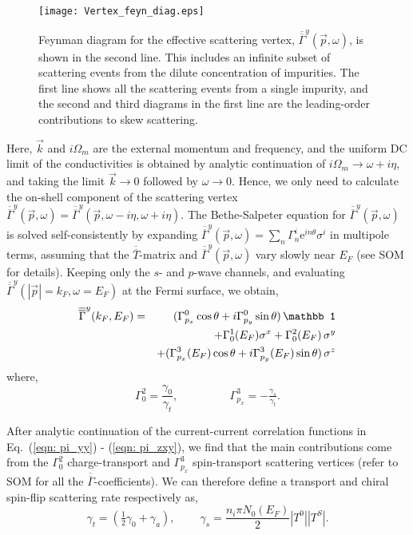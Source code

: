 \documentclass[twocolumn,epsfig,a4paper,amsmath,amssymb,showpacs,prl,superscriptaddress]{revtex4-1}
\newcommand{\be}{\begin{equation}}
\newcommand{\ee}{\end{equation}}
\newcommand{\ba}{\begin{eqnarray}}
\newcommand{\ea}{\end{eqnarray}}
\newcommand{\mI}{{\mathbb 1}}
\newcommand{\me}{\mathrm{e}}
\newcommand{\Tbar}{\overline{\overline{T}}}
\newcommand{\Gammabar}{\overline{\overline{\Gamma}}}
\begin{document}
\begin{figure}[bht!]
\begin{center}
\texttt{[image: Vertex\_feyn\_diag.eps]}
\end{center}
\captionsetup{justification=RaggedRight, singlelinecheck=false}
\caption{\label{fig: Vertex Feyn diag} 
Feynman diagram for the effective scattering vertex, $\Gammabar^{y}(\vec{p}, \omega)$, is shown in the second line. This includes an infinite subset of scattering events from the dilute concentration of  impurities. The first line shows all the scattering events from a single impurity, and the second and third diagrams in the first line are the leading-order contributions to skew scattering.}
\end{figure}

Here, $\vec{k}$ and $i \Omega_m$ are the  external momentum and frequency, and the uniform DC limit of the conductivities is obtained by analytic continuation of $i \Omega_m \rightarrow \omega + i \eta$, and taking the limit $\vec{k} \rightarrow 0$ followed by $\omega \rightarrow 0$. Hence, we only need to calculate the on-shell component of the scattering vertex $\Gammabar^{y}(\vec{p}, \omega) = \Gammabar^{y}(\vec{p}, \omega - i \eta, \omega + i \eta)$. The Bethe-Salpeter equation for $\Gammabar^{y}(\vec{p}, \omega)$ is solved self-consistently by expanding $\Gammabar^{y}(\vec{p}, \omega) = \sum_{n} \Gamma^{i}_{n} \me^{i n \theta} \sigma^i $ in multipole terms, assuming that the $\Tbar$-matrix and $\Gammabar^{y}(\vec{p}, \omega)$ vary slowly near $E_F$ (see SOM for details). Keeping only the $s$- and $p$-wave channels, and evaluating $\Gammabar^{y}(|\vec{p}| = k_F, \omega = E_F)$ at the Fermi surface, we obtain,
%
\ba
\label{eqn: vertex func}
\Gammabar^{y}(k_F, E_F) & = & (\Gamma^0_{p_x} \cos \theta + i \Gamma^0_{p_y} \sin \theta) \, \mI \\
 & & + \Gamma^1_0(E_F) \sigma^x + \Gamma^2_0(E_F) \, \sigma^y  \cr
 & & + (\Gamma^3_{p_x}(E_F) \cos \theta + i \Gamma^3_{p_y}(E_F) \sin \theta) \, \sigma^z \nonumber
\ea 
%
where,
%
\be
\Gamma^2_0 = \frac{\gamma_0}{\gamma_{t}}  \text{,}    \hspace{2cm}   \Gamma^3_{p_x} = - \tfrac{\gamma_{s}}{\gamma_t}.
\ee 

After analytic continuation of the current-current correlation functions in Eq.~(\ref{eqn: pi_yy})  - (\ref{eqn: pi_zxy}), we find that the main contributions come from the $\Gamma^2_0$ charge-transport and $\Gamma^3_{p_x}$ spin-transport scattering vertices (refer to SOM for all the $\Gammabar$-coefficients). We can therefore define a transport and chiral spin-flip scattering rate respectively as, 
%
\be
\label{eqn: transport coeffs}
\gamma_t = ( \tfrac{1}{2} \gamma_0 + \gamma_a) \text{,}    \hspace{1cm}  \gamma_{s} = \frac{n_i \pi N_0(E_F)}{2} |T^0| |T^S|.
\ee
\end{document}
